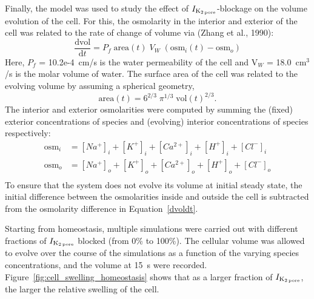 Finally, the model was used to study the effect of $I_{\rm K_{2\,
    pore}}$-blockage on the volume evolution of the cell. For this,
the osmolarity in the interior and exterior of the cell was related to
the rate of change of volume via (Zhang et al., 1990):
\begin{equation}
  \frac{\mathrm{d}\mathrm{vol}}{\mathrm{d}t} = P_f\;
  \mathrm{area}(t)\; V_W\; (\mathrm{osm}_i(t) - \mathrm{osm}_o)
  \label{dvoldt}
\end{equation}
Here, $P_f$ = 10.2e-4~cm/s is the water permeability of the cell and
V$_W$ = 18.0~cm$^3$/s is the molar volume of water. The surface area
of the cell was related to the evolving volume by assuming a spherical
geometry,
\begin{equation*}
\mathrm{area}(t) = 6^{2/3}\; \pi^{1/3}\;
  \mathrm{vol}(t)^{2/3}.
\end{equation*}
The interior and exterior osmolarities were computed by summing the
(fixed) exterior concentrations of species and (evolving) interior
concentrations of species respectively:
\begin{equation*}
  \begin{split}
  \mathrm{osm}_i &= \left[Na^{+}\right]_{i} + \left[K^{+}\right]_{i} +
  \left[Ca^{2+}\right]_{i} + \left[H^{+}\right]_{i} +
  \left[Cl^{-}\right]_{i}\\
  \mathrm{osm}_o &= \left[Na^{+}\right]_{o} + \left[K^{+}\right]_{o} +
  \left[Ca^{2+}\right]_{o} + \left[H^{+}\right]_{o} +
  \left[Cl^{-}\right]_{o}\\
  \end{split}
\end{equation*}
To ensure that the system does not evolve its volume at initial steady
state, the initial difference between the osmolarities inside and
outside the cell is subtracted from the osmolarity difference in
Equation~\ref{dvoldt}.

Starting from homeostasis, multiple simulations were carried out with
different fractions of $I_{\rm K_{2\, pore}}$ blocked (from 0\% to
100\%). The cellular volume was allowed to evolve over the course of
the simulations as a function of the varying species concentrations,
and the volume at 15~s were
recorded. Figure~\ref{fig:cell_swelling_homeostasis} shows that as a
larger fraction of $I_{\rm K_{2\, pore}}$, the larger the relative
swelling of the cell.

